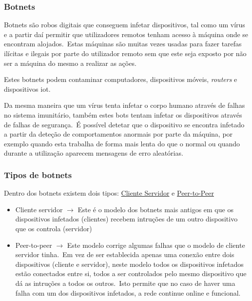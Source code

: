 \documentclass{report}
\begin{document}
\subsubsection{\large Botnets}
\label{subsubsec:botnets}
Botnets são robos digitais que conseguem infetar dispositivos, tal como um vírus e a partir daí permitir que utilizadores remotos tenham acesso à máquina onde se encontram alojados.\ Estas máquinas são muitas vezes usadas para fazer tarefas ilícitas e ilegais por parte do utilizador remoto sem que este seja exposto por não ser a máquina do mesmo a realizar as ações.
\par Estes botnets podem contaminar computadores, dispositivos móveis, \textit{routers} e dispositivos \ac{iot}.
\par Da mesma maneira que um vírus tenta infetar o corpo humano através de falhas no sistema imunitário, também estes bots tentam infetar os dispositivos através de falhas de segurança.\ É possível detetar que o dispositivo se encontra infetado a partir da deteção de comportamentos anormais por parte da máquina, por exemplo quando esta trabalha de forma mais lenta do que o normal ou quando durante a utilização aparecem mensagens de erro aleatórias.\\
\subsubsection{Tipos de botnets}
Dentro dos botnets existem dois tipos: \underline{Cliente Servidor} e \underline{Peer-to-Peer}

\begin{itemize}
\item Cliente servidor $\rightarrow$
Este é o modelo dos botnets mais antigos em que os dispositivos infetados (clientes) recebem intruções de um outro dispositivo que os controla (servidor)
\item Peer-to-peer $\rightarrow$ Este modelo corrige algumas falhas que o modelo de cliente servidor tinha.\ Em vez de ser establecida apenas uma conexão entre dois dispositivos (cliente e servidor), neste modelo todos os dispositivos infetados estão conectados entre si, todos a ser controlados pelo mesmo dispositivo que dá as intruções a todos os outros.\ Isto permite que no caso de haver uma falha com um dos dispositivos infetados, a rede continue online e funcional.\\
\end{itemize}
\end{document}

